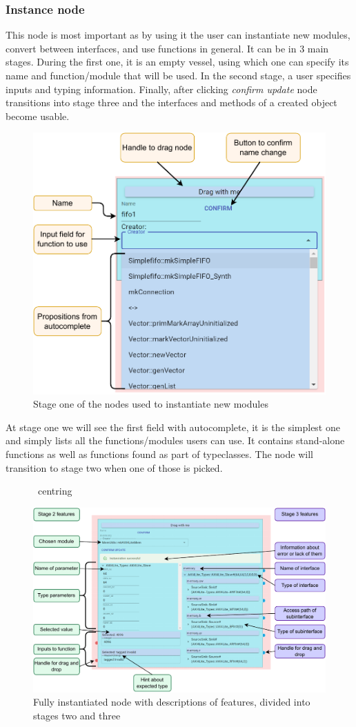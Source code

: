 \documentclass[12pt]{report}
\begin{document}
\subsubsection{Instance node} 
This node is most important as by using it the user can instantiate new modules, convert between interfaces, and use functions in general. It can be in 3 main stages. During the first one, it is an empty vessel, using which one can specify its name and function/module that will be used. In the second stage, a user specifies inputs and typing information. Finally, after clicking \emph{confirm update} node transitions into stage three and the interfaces and methods of a created object become usable. 
\newpage 
\begin{figure}[!h] 
   \centering 
    
   \includegraphics[width=0.63\columnwidth]{pdfExports/LargeMapInstanceNode.pdf} 
   \caption{Stage one of the nodes used to instantiate new modules} 
\end{figure} 
At stage one we will see the first field with autocomplete, it is the simplest one and simply lists all the functions/modules users can use. It contains stand-alone functions as well as functions found as part of typeclasses. The node will transition to stage two when one of those is picked. 
\begin{figure}[!h] 
   \ centring 
    
   \includegraphics[width=1\columnwidth]{pdfExports/LargeMap-InstanceNodePart2.drawio.pdf} 
   \caption{Fully instantiated node with descriptions of features, divided into stages two and three} 
\end{figure} 
\end{document}
